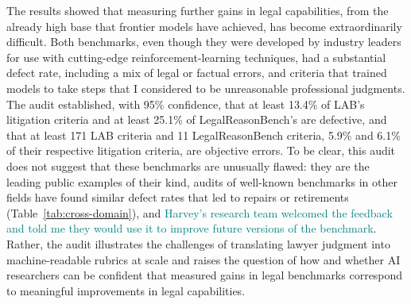 \documentclass[11pt]{article}
\newcommand{\pending}[1]{\textcolor{teal}{#1}}
\newcommand{\labDefectiveShare}{13.4}
\newcommand{\labObjectiveLB}{171}
\newcommand{\labObjectiveShare}{5.9}
\newcommand{\lrbDefectiveShareLB}{25.1}
\newcommand{\lrbObjectiveLB}{11}
\newcommand{\lrbObjectiveShareLB}{6.1}
\begin{document}
The results showed that measuring further gains in legal capabilities, from the already high base that frontier models have achieved, has become extraordinarily difficult. Both benchmarks, even though they were developed by industry leaders for use with cutting-edge reinforcement-learning techniques, had a substantial defect rate, including a mix of legal or factual errors, and criteria that trained models to take steps that I considered to be unreasonable professional judgments. The audit established, with 95\% confidence, that at least \labDefectiveShare\% of LAB's litigation criteria and at least \lrbDefectiveShareLB\% of LegalReasonBench's are defective, and that at least \labObjectiveLB{} LAB criteria and \lrbObjectiveLB{} LegalReasonBench criteria, \labObjectiveShare\% and \lrbObjectiveShareLB\% of their respective litigation criteria, are objective errors. To be clear, this audit does not suggest that these benchmarks are unusually flawed: they are the leading public examples of their kind, audits of well-known benchmarks in other fields have found similar defect rates that led to repairs or retirements (Table~\ref{tab:cross-domain}), and \pending{Harvey's research team welcomed the feedback and told me they would use it to improve future versions of the benchmark}. Rather, the audit illustrates the challenges of translating lawyer judgment into machine-readable rubrics at scale and raises the question of how and whether AI researchers can be confident that measured gains in legal benchmarks correspond to meaningful improvements in legal capabilities.
\end{document}
